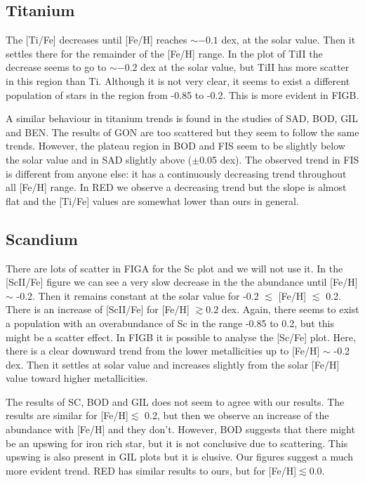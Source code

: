 \documentclass[dvips,12pt,a4paper]{report}
\begin{document}
{{\subsection{Titanium}

The [Ti/Fe] decreases until [Fe/H] reaches $\sim -0.1$ dex, at the solar value. Then it settles there for the remainder of the [Fe/H] range. In the plot of TiII the decrease seems to go to $\sim -0.2$ dex at the solar value, but TiII has more scatter in this region than Ti. Although it is not very clear, it seems to exist a different population of stars in the region from -0.85 to -0.2. This is more evident in FIGB.  %

A similar behaviour in titanium trends is found in the studies of SAD, BOD, GIL and BEN. The results of GON are too scattered but they seem to follow the same trends. However, the plateau region in BOD and FIS seem to be slightly below the solar value and in SAD slightly above ($\pm$0.05 dex). The observed trend in FIS is different from anyone else: it has a continuously decreasing trend throughout all [Fe/H] range. In RED we observe a decreasing trend but the slope is almost flat and the [Ti/Fe] values are somewhat lower than ours in general. 


\subsection{Scandium}

There are lots of scatter in FIGA for the Sc plot and  we will not use it. In the [ScII/Fe] figure we can see a very slow decrease in the the abundance until [Fe/H] $\sim$ -0.2. Then it remains constant at the solar value for -0.2 $\lesssim$ [Fe/H] $\lesssim$ 0.2. There is an increase of [ScII/Fe] for [Fe/H] $\gtrsim 0.2$ dex. Again, there seems to exist a population with an overabundance of Sc in the range -0.85 to 0.2, but this might be a scatter effect. In FIGB it is possible to analyse the [Sc/Fe] plot. Here, there is a clear downward trend from the lower metallicities up to [Fe/H] $\sim$ -0.2 dex. Then it settles at solar value and increases slightly from the solar [Fe/H] value toward higher metallicities.

The results of SC, BOD and GIL does not seem to agree with our results. The results are similar for [Fe/H]$\lesssim$ 0.2, but then we observe an increase of the abundance with [Fe/H] and they don't. However, BOD suggests that there might be an upswing for iron rich star, but it is not conclusive due to scattering. This upswing is also present in GIL plots but it is elusive. Our figures suggest a much more evident trend. RED has similar results to ours, but for [Fe/H]$\lesssim$0.0.

}}
\end{document}
